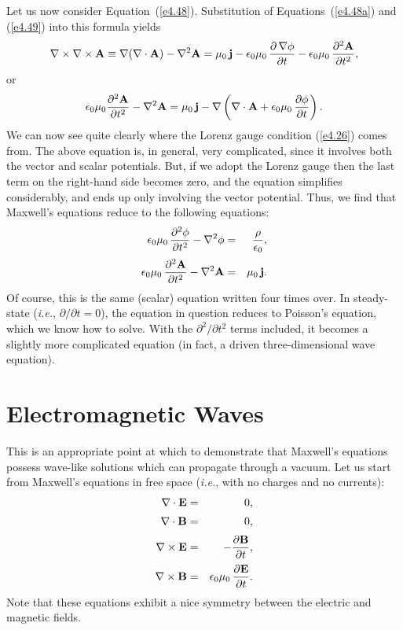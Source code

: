 Let us now consider Equation~(\ref{e4.48}). Substitution of Equations~(\ref{e4.48a}) and (\ref{e4.49}) into this formula
yields
\begin{equation}
\nabla\times\nabla\times {\bf A} \equiv
\nabla(\nabla\cdot{\bf A}) - \nabla^2 {\bf A} = \mu_0\,{\bf j}
- \epsilon_0\mu_0 \,\frac{\partial\,\nabla\phi}{\partial t} - \epsilon_0\mu_0\,
\frac{\partial^2 {\bf A}}{\partial t^2},
\end{equation}
or
\begin{equation}
\epsilon_0 \mu_0 \frac{\partial^2 {\bf A}}{\partial t^2} - \nabla^2 {\bf A}
= \mu_0\, {\bf j} - \nabla\left(\nabla\cdot{\bf A} +\epsilon_0\mu_0\, \frac{\partial\phi}
{\partial t}\right).
\end{equation}
We can now see quite clearly
where  the Lorenz gauge condition (\ref{e4.26}) comes from. The above
equation  is, in general, very complicated, since it involves both the vector and
scalar potentials. But, if we adopt the Lorenz gauge then the last term on
the right-hand side becomes zero, and the equation  simplifies considerably, and ends up
only involving the vector potential. Thus, we find that Maxwell's equations
reduce to the following equations:
\begin{eqnarray}
\epsilon_0\mu_0\,\frac{\partial^2\phi}{\partial t^2} - \nabla^2\phi& = &\frac{\rho}
{\epsilon_0}, \\[0.5ex]
\epsilon_0\mu_0\,\frac{\partial^2{\bf A} }{\partial t^2} - 
\nabla^2{\bf A} & = &\mu_0\, {\bf j}.
\end{eqnarray}
Of course, this is the same (scalar) equation written four times over. In steady-state ({\em i.e.},
$\partial/\partial t=0$),  the equation in question reduces to  Poisson's equation, which we know
how to solve. With the $\partial^2/\partial t^2$ terms  included,
it becomes  a slightly more complicated equation (in fact, a
driven three-dimensional wave equation). 

\section{Electromagnetic Waves}\label{sem}
This is  an
appropriate point at which to demonstrate that Maxwell's equations possess
 wave-like solutions which can propagate through a vacuum. Let us start from Maxwell's equations
in free space ({\em i.e.}, with no charges and no currents):
\begin{eqnarray}
\nabla\cdot{\bf E} &=& 0,\label{e4.56}\\[0.5ex]
\nabla\cdot{\bf B} &=& 0,\label{e4.57}\\[0.5ex]
\nabla\times{\bf E} &=& -\frac{\partial {\bf B}}{\partial t},\label{e4.58}\\[0.5ex]
\nabla\times{\bf B} &=& \epsilon_0\mu_0\,\frac{\partial {\bf E}}{\partial t}.\label{e4.59}
\end{eqnarray}
Note that these equations exhibit a nice symmetry between the electric and magnetic
fields. 

